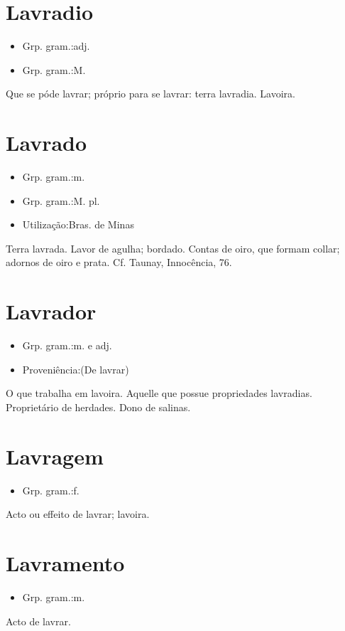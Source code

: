 \section{Lavradio}
\begin{itemize}
\item {Grp. gram.:adj.}
\end{itemize}
\begin{itemize}
\item {Grp. gram.:M.}
\end{itemize}
Que se póde lavrar; próprio para se lavrar: \textunderscore terra lavradia\textunderscore .
Lavoira.
\section{Lavrado}
\begin{itemize}
\item {Grp. gram.:m.}
\end{itemize}
\begin{itemize}
\item {Grp. gram.:M. pl.}
\end{itemize}
\begin{itemize}
\item {Utilização:Bras. de Minas}
\end{itemize}
Terra lavrada.
Lavor de agulha; bordado.
Contas de oiro, que formam collar; adornos de oiro e prata. Cf. Taunay, \textunderscore Innocência\textunderscore , 76.
\section{Lavrador}
\begin{itemize}
\item {Grp. gram.:m.  e  adj.}
\end{itemize}
\begin{itemize}
\item {Proveniência:(De \textunderscore lavrar\textunderscore )}
\end{itemize}
O que trabalha em lavoira.
Aquelle que possue propriedades lavradias.
Proprietário de herdades.
Dono de salinas.
\section{Lavragem}
\begin{itemize}
\item {Grp. gram.:f.}
\end{itemize}
Acto ou effeito de lavrar; lavoira.
\section{Lavramento}
\begin{itemize}
\item {Grp. gram.:m.}
\end{itemize}
Acto de lavrar.
